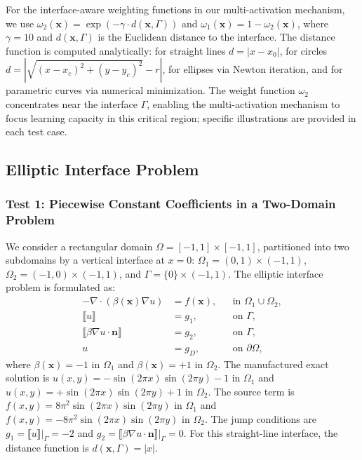 \documentclass{article}
\begin{document}
For the interface-aware weighting functions in our multi-activation mechanism, we use $\omega_2(\mathbf{x}) = \exp(-\gamma \cdot d(\mathbf{x},\Gamma))$ and $\omega_1(\mathbf{x}) = 1 - \omega_2(\mathbf{x})$, where $\gamma = 10$ and $d(\mathbf{x},\Gamma)$ is the Euclidean distance to the interface. The distance function is computed analytically: for straight lines $d = |x - x_0|$, for circles $d = |\sqrt{(x-x_c)^2 + (y-y_c)^2} - r|$, for ellipses via Newton iteration, and for parametric curves via numerical minimization. The weight function $\omega_2$ concentrates near the interface $\Gamma$, enabling the multi-activation mechanism to focus learning capacity in this critical region; specific illustrations are provided in each test case.

\subsection{Elliptic Interface Problem}
\subsubsection{Test 1: Piecewise Constant Coefficients in a Two-Domain Problem}

We consider a rectangular domain $\Omega = [-1,1] \times [-1,1]$, partitioned into two subdomains by a vertical interface at $x = 0$: $\Omega_1 = (0,1) \times (-1,1)$, $\Omega_2 = (-1,0) \times (-1,1)$, and $\Gamma = \{0\} \times (-1,1)$. The elliptic interface problem is formulated as:
\begin{equation}\label{test1_pde}
\begin{aligned}
-\nabla \cdot (\beta(\boldsymbol{x}) \nabla u) &= f(\boldsymbol{x}), & & \text{in } \Omega_1 \cup \Omega_2, \\
\llbracket u \rrbracket &= g_1, & & \text{on } \Gamma, \\
\llbracket \beta \nabla u \cdot \boldsymbol{n} \rrbracket &= g_2, & & \text{on } \Gamma, \\
u &= g_D, & & \text{on } \partial \Omega,
\end{aligned}
\end{equation}
where $\beta(\boldsymbol{x}) = -1$ in $\Omega_1$ and $\beta(\boldsymbol{x}) = +1$ in $\Omega_2$. The manufactured exact solution is $u(x,y) = -\sin(2\pi x)\sin(2\pi y) - 1$ in $\Omega_1$ and $u(x,y) = +\sin(2\pi x)\sin(2\pi y) + 1$ in $\Omega_2$. The source term is $f(x,y) = 8\pi^2 \sin(2\pi x)\sin(2\pi y)$ in $\Omega_1$ and $f(x,y) = -8\pi^2 \sin(2\pi x)\sin(2\pi y)$ in $\Omega_2$. The jump conditions are $g_1 = \llbracket u \rrbracket|_{\Gamma} = -2$ and $g_2 = \llbracket \beta \nabla u \cdot \boldsymbol{n} \rrbracket|_{\Gamma} = 0$. For this straight-line interface, the distance function is $d(\mathbf{x}, \Gamma) = |x|$.
\end{document}
